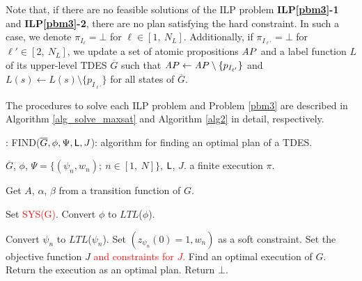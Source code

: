 \documentclass{article}
\newcommand{\AP}{{\textit AP}}
\newcommand{\Len}{{\sf L}}
\newcommand{\M}{\mathcal{M}}
\newcommand{\W}{\mathcal{W}}
\newcommand{\red}[1]{\textcolor{red}{#1}}
\begin{document}
%
Note that, if there are no feasible solutions of the ILP problem {\bf ILP\ref{pbm3}-1} and {\bf ILP\ref{pbm3}-2}, there are no plan satisfying the hard constraint.  In such a case, we denote $\pi_{I_\ell}=\bot$ for $\ell\in[1,~N_L]$.
Additionally, if $\pi_{I_{\ell'}}=\bot$ for $\ell'\in[2,~N_L]$, we update a set of atomic propositions $\AP$ and a label function $L$ of its upper-level TDES $\overline{G}$ such that $\AP\leftarrow \AP\setminus \{p_{I_{\ell'}}\}$ and $L(s)\leftarrow L(s)\setminus \{p_{I_{\ell'}}\}$ for all states of $\overline{G}$.
\begin{comment}


Finally, for the top-level planning, the ILP problem {\bf ILP\ref{pbm3}-3} for finding $w_G(k)\in\{0,1\}^{|S|}$ ($k=[0,~\Len]$) is given by
%
\begin{eqnarray}
\mbox{\bf ILP\ref{pbm3}-3}: 
&\mbox{maximize }&J_{\mu,\M,\W} \notag \\
&\mbox{subject to }&SYS(G), \notag \\
&& LTL(\phi),\notag \\
&& LTL(\psi_n) \  {\rm{for\ each\ }}  n \in [1,\ N], \notag\\
&& w_G(0)=w_{G,s_0}, \notag \\
&&z_{\phi} (0) = 1. \notag
\end{eqnarray}
%

\end{comment}





The procedures to solve each ILP problem and Problem \ref{pbm3} are described in Algorithm \ref{alg_solve_maxsat} and Algorithm \ref{alg2} in detail, respectively.
%

%
%
\begin{algorithm}
\caption{: FIND($\overline{G},\phi,\Psi,\Len,J$): algorithm for finding an optimal plan of a TDES.} \label{alg_solve_maxsat}
\begin{algorithmic}
%
\Require $\overline{G}$, $\phi$, $\Psi=\{(\psi_n,{w_n});\ n\in[1,\ N]\}$, $\Len$, $J$.
\Ensure a finite execution $\pi$.

\State Get $A$, $\alpha$, $\beta$ from a transition function of $G$.

\State Set \red{SYS(G)}.
\State Convert $\phi$ to $LTL$($\phi$).

	\State Convert $\psi_n$ to $LTL$($\psi_n$).
	\State Set $(z_{\psi_n}(0)=1,{w_n})$ as a soft constraint.
	\EndFor
\EndIf
\State Set the objective function $J$ \red{and constraints for $J$.}
\State Find an optimal execution of $G$. %
	\State Return the execution as an optimal plan.
\Else
	\State  Return $\bot$.
\EndIf
\end{algorithmic}
\end{algorithm}
%
\end{document}
